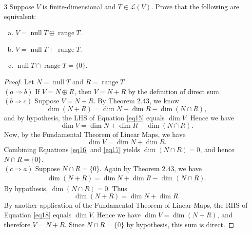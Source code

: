 \documentclass{extarticle}
\newenvironment{problem}[1]{\begin{prob*}{#1}{}}{\end{prob*}}
\newcommand{\Hom}{\mathcal{L}}
\DeclareMathOperator{\Null}{null}
\DeclareMathOperator{\Range}{range}
\begin{document}
\begin{problem}{3}
Suppose $V$ is finite-dimensional and $T\in\Hom(V)$.  Prove that the following are equivalent:
\begin{enumerate}[(a)]
\item $V = \Null T\oplus \Range T$.
\item $V = \Null T + \Range T$.
\item $\Null T\cap \Range T = \{0\}$.
\end{enumerate}
\end{problem}
\begin{proof}
Let $N = \Null T$ and $R = \Range T$.\\
\indent $(a \Rightarrow b)$  If $V = N\oplus R$, then $V = N + R$ by the definition of direct sum.\\
\indent $(b \Rightarrow c)$  Suppose $V = N + R$.  By Theorem 2.43, we know 
\begin{equation}
\dim(N + R) = \dim N + \dim R - \dim ( N \cap R), \label{eq15}
\end{equation}
and by hypothesis, the LHS of Equation \ref{eq15} equals $\dim V$.  Hence we have
\begin{equation}
\dim V = \dim N + \dim R - \dim (N\cap R). \label{eq16}
\end{equation}
Now, by the Fundamental Theorem of Linear Maps, we have
\begin{equation}
\dim V = \dim N + \dim R. \label{eq17}
\end{equation}
Combining Equations \ref{eq16} and \ref{eq17} yields $\dim(N\cap R) = 0$, and hence $N\cap R =\{0\}$.\\
\indent $(c\Rightarrow a)$ Suppose $N\cap R =\{0\}$.  Again by Theorem 2.43, we have 
\begin{align*}
\dim( N + R) = \dim N + \dim R- \dim (N\cap R).
\end{align*}
By hypothesis, $\dim (N\cap R) = 0$.  Thus 
\begin{equation}
\dim(N + R) = \dim N + \dim R.  \label{eq18}
\end{equation}
By another application of the Fundamental Theorem of Linear Maps, the RHS of Equation \ref{eq18} equals $\dim V$.  Hence we have $\dim V = \dim(N + R)$, and therefore $V = N + R$.  Since $N\cap R = \{0\}$ by hypothesis, this sum is direct.
\end{proof}
\end{document}
